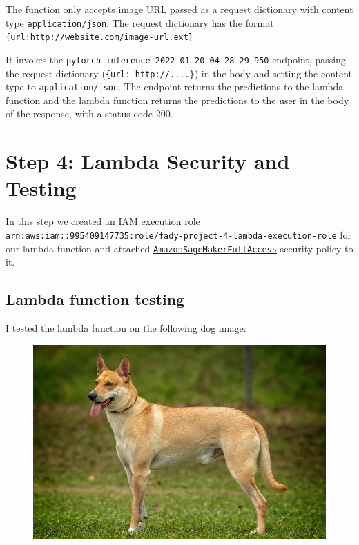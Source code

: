 \documentclass[a4paper
]{article}
\begin{document}
The function only accepts image URL passed as a request dictionary with
content type \texttt{application/json}. The request dictionary has the
format
\texttt{\{\textquotesingle{}url\textquotesingle{}:\textquotesingle{}http://website.com/image-url.ext\textquotesingle{}\}}

It invokes the \texttt{pytorch-inference-2022-01-20-04-28-29-950}
endpoint, passing the request dictionary
(\texttt{\{\textquotesingle{}url\textquotesingle{}:\ \textquotesingle{}http://....\textquotesingle{}\}})
in the body and setting the content type to \texttt{application/json}.
The endpoint returns the predictions to the lambda function and the
lambda function returns the predictions to the user in the body of the
response, with a status code 200.

\newpage
\hypertarget{step-4-lambda-security-and-testing}{%
\section{Step 4: Lambda Security and
Testing}\label{step-4-lambda-security-and-testing}}

In this step we created an IAM execution role
\texttt{arn:aws:iam::995409147735:role/fady-project-4-lambda-execution-role}
for our lambda function and attached
\href{https://console.aws.amazon.com/iam/home\#/policies/arn:aws:iam::aws:policy/AmazonSageMakerFullAccess}{\texttt{AmazonSageMakerFullAccess}}
security policy to it.

\hypertarget{lambda-function-testing}{%
\subsection{Lambda function testing}\label{lambda-function-testing}}

I tested the lambda function on the following dog image:

\begin{figure}[H]
  \centering
\includegraphics[width=0.75\linewidth]{../Carolina-Dog-standing-outdoors.jpg}
\end{figure}
\end{document}
